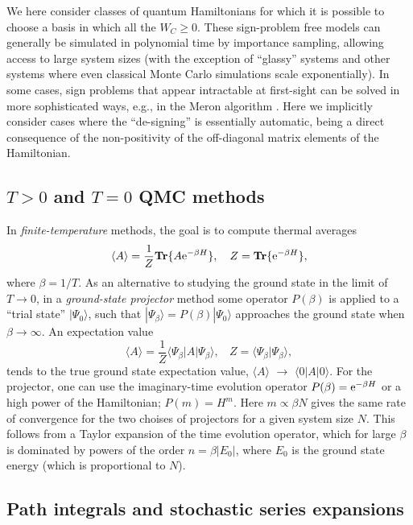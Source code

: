\documentclass[range]{ar2e}
\begin{document}
We here consider classes of quantum Hamiltonians for which it is possible to choose a basis in which all the $W_C\geq 0$. 
These sign-problem free models can generally be simulated in polynomial time by 
importance sampling, allowing access to large system sizes (with the exception of ``glassy'' systems and
other systems where even classical Monte Carlo simulations scale exponentially). In some cases, sign problems that
appear intractable at first-sight can be solved in more sophisticated ways, e.g., in the Meron algorithm \cite{Chandrasekharan99}. 
Here we implicitly consider cases where the ``de-signing'' is essentially automatic, being a direct consequence of the non-positivity of the  
off-diagonal matrix elements of the Hamiltonian.
 
\subsection{$T>0$ and $T=0$ QMC methods}
\label{ss:method}

In {\it finite-temperature} methods, the goal is to compute thermal averages
\begin{equation}
\langle A\rangle = \frac{1}{Z}{\bf Tr}\{ A{\rm e}^{-\beta H}\},~~~
Z = {\bf Tr}\{ {\rm e}^{-\beta H}\},
\label{za1}
\end{equation}
where $\beta=1/T$. As an alternative to studying the ground state in the limit of  $T\to 0$, in a {\it ground-state projector} method some 
operator $P(\beta)$  is applied to a ``trial state'' $|\Psi_0\rangle$, such that $|\Psi_\beta \rangle = P(\beta)|\Psi_0\rangle$ approaches the 
ground state when $\beta \to \infty$. An expectation value
\begin{equation}
\langle A\rangle = \frac{1}{Z}\langle \Psi_\beta|A|\Psi_\beta\rangle,~~~~ Z = \langle \Psi_\beta|\Psi_\beta\rangle,
\label{za2}
\end{equation}
tends to the true ground state expectation value, $\langle A\rangle$ $\to$ $\langle 0| A|0\rangle$. For the projector, one can use the imaginary-time
evolution operator $P(\beta)={\rm e}^{-\beta H}$ or a high power of the Hamiltonian; $P(m)=H^m$. Here $m \propto \beta N$ gives the same rate of 
convergence for the two choises of projectors for a given system size $N$. This follows from a Taylor expansion of the time evolution operator, which for large 
$\beta$ is dominated by powers of the order $n=\beta |E_0|$, where $E_0$ is the ground state energy (which is proportional to $N$).

\subsection{Path integrals and stochastic series expansions}
\end{document}
